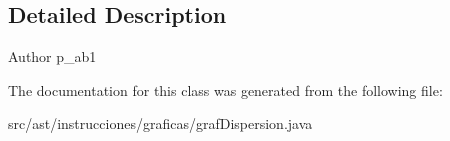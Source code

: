 \subsection{Detailed Description}
\begin{DoxyAuthor}{Author}
p\+\_\+ab1 
\end{DoxyAuthor}


The documentation for this class was generated from the following file\+:\begin{DoxyCompactItemize}
\item 
src/ast/instrucciones/graficas/graf\+Dispersion.\+java\end{DoxyCompactItemize}
